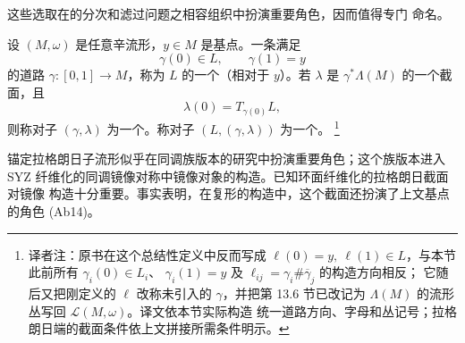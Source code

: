 这些选取在\termFukayaCategory{}的分次和滤过问题之相容组织中扮演重要角色，因而值得专门
命名。

\begin{definition}
\label{def:graded-anchor-anchored-lagrangian}
设 $(M,\omega)$ 是任意辛流形，$y\in M$ 是基点。一条满足
\[
  \gamma(0)\in L,
  \qquad
  \gamma(1)=y
\]
的道路 $\gamma:[0,1]\to M$，称为 $L$ 的一个\termAnchor{}（相对于 $y$）。若
$\lambda$ 是 $\gamma^*\Lambda(M)$ 的一个截面，且
\[
  \lambda(0)=T_{\gamma(0)}L,
\]
则称对子 $(\gamma,\lambda)$ 为一个\termGradedAnchor{}。称对子
$(L,(\gamma,\lambda))$ 为一个\termAnchoredLagrangianSubmanifold{}。
\footnote{译者注：原书在这个总结性定义中反而写成
$\ell(0)=y,\ \ell(1)\in L$，与本节此前所有 $\gamma_i(0)\in L_i$、
$\gamma_i(1)=y$ 及 $\ell_{ij}=\gamma_i\#\overline\gamma_j$ 的构造方向相反；
它随后又把刚定义的 $\ell$ 改称未引入的 $\gamma$，并把第 13.6 节已改记为
$\Lambda(M)$ 的\personGrassmann{}流形丛写回 $\mathcal L(M,\omega)$。译文依本节实际构造
统一道路方向、字母和丛记号；拉格朗日端的截面条件依上文拼接所需条件明示。}
\end{definition}

\begin{remark}
\label{rem:anchored-lagrangians-syz}
锚定拉格朗日子流形似乎在\personFloer{}同调族版本的研究中扮演重要角色；这个族版本进入
SYZ 纤维化的同调镜像对称中镜像对象的构造。已知环面纤维化的拉格朗日截面对镜像
构造十分重要。事实表明，在\personFloer{}复形的构造中，这个截面还扮演了上文基点的角色
(Ab14)。
\end{remark}
